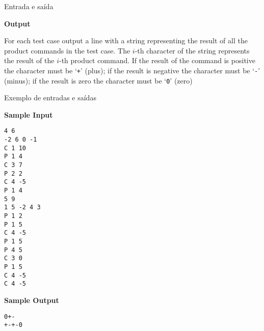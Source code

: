 \begin{frame}[fragile]{Entrada e saída}

\textbf{Output}

For each test case output a line with a string representing the result of all the product commands 
in the test case. The $i$-th character of the string represents the result of the $i$-th product 
command. If the result of the command is positive the character must be ‘\texttt{+}’ (plus); if 
the result is negative the character must be ‘\texttt{-}’ (minus); if the result is zero the 
character must be ‘\texttt{0}’ (zero)

\end{frame}


\begin{frame}[fragile]{Exemplo de entradas e saídas}

\begin{footnotesize}
\begin{minipage}[t]{0.6\textwidth}
\textbf{Sample Input}
\begin{verbatim}
4 6
-2 6 0 -1
C 1 10
P 1 4
C 3 7
P 2 2
C 4 -5
P 1 4
5 9
1 5 -2 4 3
P 1 2
P 1 5
C 4 -5
P 1 5
P 4 5
C 3 0
P 1 5
C 4 -5
C 4 -5
\end{verbatim}
\end{minipage}
\begin{minipage}[t]{0.35\textwidth}
\textbf{Sample Output}
\begin{verbatim}
0+-
+-+-0
\end{verbatim}
\end{minipage}
\end{footnotesize}

\end{frame}

